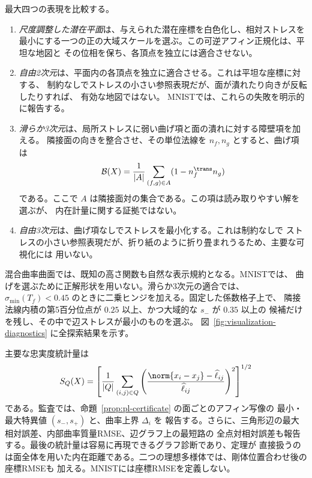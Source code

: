最大四つの表現を比較する。
\begin{enumerate}
  \item \emph{尺度調整した潜在平面}は、与えられた潜在座標を白色化し、相対ストレスを
  最小にする一つの正の大域スケールを選ぶ。この可逆アフィン正規化は、平坦な地図と
  その位相を保ち、各頂点を独立には適合させない。
  \item \emph{自由2次元}は、平面内の各頂点を独立に適合させる。これは平坦な座標に対する、
  制約なしでストレスの小さい参照表現だが、面が潰れたり向きが反転したりすれば、
  有効な地図ではない。
  MNISTでは、これらの失敗を明示的に報告する。
  \item \emph{滑らか3次元}は、局所ストレスに弱い曲げ項と面の潰れに対する障壁項を加える。
  隣接面の向きを整合させ、その単位法線を $n_f,n_g$ とすると、曲げ項は
  \begin{equation}
   \mathcal B(X)=\frac1{|A|}\sum_{(f,g)\in A}(1-n_f^{\trans}n_g)
   \label{eq:bending-convention}
  \end{equation}
  である。ここで $A$ は隣接面対の集合である。この項は読み取りやすい解を選ぶが、
  内在計量に関する証拠ではない。
  \item \emph{自由3次元}は、曲げ項なしでストレスを最小化する。これは制約なしで
  ストレスの小さい参照表現だが、折り紙のように折り畳まれうるため、主要な可視化には
  用いない。
\end{enumerate}
混合曲率曲面では、既知の高さ関数も自然な表示規約となる。MNISTでは、
曲げを選ぶために正解形状を用いない。滑らか3次元の適合では、
$\sigma_{\min}(T_f)<0.45$ のときに二乗ヒンジを加える。固定した係数格子上で、
隣接法線内積の第5百分位点が $0.25$ 以上、かつ大域的な $s_-$ が $0.35$ 以上の
候補だけを残し、その中で辺ストレスが最小のものを選ぶ。
図~\ref{fig:visualization-diagnostics} に全探索結果を示す。

主要な忠実度統計量は
\begin{equation}
 S_Q(X)=\left[
 \frac1{|Q|}\sum_{(i,j)\in Q}
 \left(
 \frac{\norm{x_i-x_j}-\widehat\ell_{ij}}
 {\widehat\ell_{ij}}
 \right)^2\right]^{1/2}
 \label{eq:reported-stress}
\end{equation}
である。監査では、命題~\ref{prop:pl-certificate} の面ごとのアフィン写像の
最小・最大特異値 $(s_-,s_+)$ と、曲率上界 $\Delta_i$ を
報告する。さらに、三角形辺の最大相対誤差、内部曲率質量RMSE、辺グラフ上の最短路の
全点対相対誤差も報告する。最後の統計量は容易に再現できるグラフ診断であり、定理が
直接扱うのは面全体を用いた内在距離である。二つの理想多様体では、剛体位置合わせ後の座標RMSEも
加える。MNISTには座標RMSEを定義しない。


